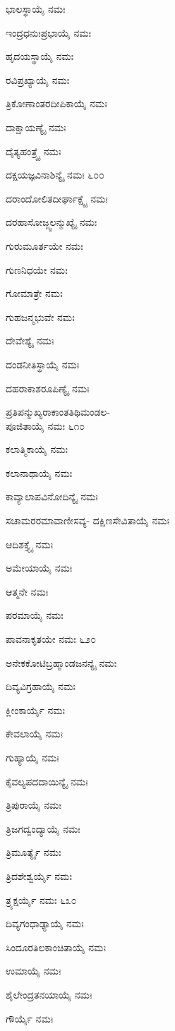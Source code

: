 ಭಾಲಸ್ಥಾಯೈ ನಮಃ

ಇಂದ್ರಧನುಃಪ್ರಭಾಯೈ ನಮಃ

ಹೃದಯಸ್ಥಾಯೈ ನಮಃ

ರವಿಪ್ರಖ್ಯಾಯೈ ನಮಃ

ತ್ರಿಕೋಣಾಂತರದೀಪಿಕಾಯೈ ನಮಃ

ದಾಕ್ಷಾಯಣ್ಯೈ ನಮಃ

ದೈತ್ಯಹಂತ್ರ್ಯೈ ನಮಃ

ದಕ್ಷಯಜ್ಞವಿನಾಶಿನ್ಯೈ ನಮಃ \num{೬೦೦}

ದರಾಂದೋಲಿತದೀರ್ಘಾಕ್ಷ್ಯೈ ನಮಃ

ದರಹಾಸೋಜ್ಜ್ವಲನ್ಮುಖ್ಯೈ ನಮಃ

ಗುರುಮೂರ್ತಯೇ ನಮಃ

ಗುಣನಿಧಯೇ ನಮಃ

ಗೋಮಾತ್ರೇ ನಮಃ

ಗುಹಜನ್ಮಭುವೇ ನಮಃ

ದೇವೇಶ್ಯೈ ನಮಃ

ದಂಡನೀತಿಸ್ಥಾಯೈ ನಮಃ

ದಹರಾಕಾಶರೂಪಿಣ್ಯೈ ನಮಃ

ಪ್ರತಿಪನ್ಮುಖ್ಯರಾಕಾಂತತಿಥಿಮಂಡಲ-\\ಪೂಜಿತಾಯೈ ನಮಃ \num{೬೧೦}

ಕಲಾತ್ಮಿಕಾಯೈ ನಮಃ

ಕಲಾನಾಥಾಯೈ ನಮಃ

ಕಾವ್ಯಾಲಾಪವಿನೋದಿನ್ಯೈ ನಮಃ

ಸಚಾಮರರಮಾವಾಣೀಸವ್ಯ- ದಕ್ಷಿಣಸೇವಿತಾಯೈ ನಮಃ

ಆದಿಶಕ್ತ್ಯೈ ನಮಃ

ಅಮೇಯಾಯೈ ನಮಃ

ಆತ್ಮನೇ ನಮಃ

ಪರಮಾಯೈ ನಮಃ

ಪಾವನಾಕೃತಯೇ ನಮಃ \num{೬೨೦}

ಅನೇಕಕೋಟಿಬ್ರಹ್ಮಾಂಡಜನನ್ಯೈ ನಮಃ

ದಿವ್ಯವಿಗ್ರಹಾಯೈ ನಮಃ

ಕ್ಲೀಂಕಾರ್ಯೈ ನಮಃ

ಕೇವಲಾಯೈ ನಮಃ

ಗುಹ್ಯಾಯೈ ನಮಃ

ಕೈವಲ್ಯಪದದಾಯಿನ್ಯೈ ನಮಃ

ತ್ರಿಪುರಾಯೈ ನಮಃ

ತ್ರಿಜಗದ್ವಂದ್ಯಾಯೈ ನಮಃ

ತ್ರಿಮೂರ್ತ್ಯೈ ನಮಃ

ತ್ರಿದಶೇಶ್ವರ್ಯೈ ನಮಃ

ತ್ರ್ಯಕ್ಷರ್ಯೈ ನಮಃ \num{೬೩೦}

ದಿವ್ಯಗಂಧಾಢ್ಯಾಯೈ ನಮಃ

ಸಿಂದೂರತಿಲಕಾಂಚಿತಾಯೈ ನಮಃ

ಉಮಾಯೈ ನಮಃ

ಶೈಲೇಂದ್ರತನಯಾಯೈ ನಮಃ

ಗೌರ್ಯೈ ನಮಃ

